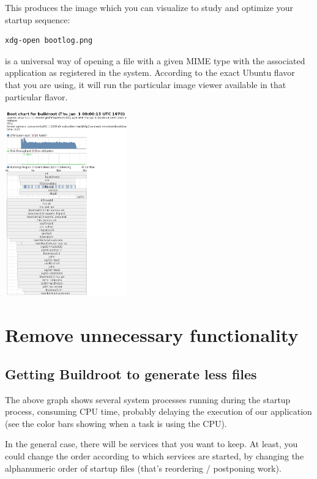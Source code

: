 This produces the  image which you can visualize to
study and optimize your startup sequence:

\begin{verbatim}
xdg-open bootlog.png
\end{verbatim}

 is a universal way of opening a file with a given MIME
type with the associated application as registered in the system.
According to the exact Ubuntu flavor that you are using,
it will run the particular image viewer available in that
particular flavor.

\begin{center}
\includegraphics[height=8cm]{labs/boot-time-init-scripts/bootlog.png}
\end{center}

\section{Remove unnecessary functionality}

\subsection{Getting Buildroot to generate less files}

The above graph shows several system processes running
during the startup process, consuming CPU time, probably delaying
the execution of our application (see the color bars showing when
a task is using the CPU).

In the general case, there will be services that you want to keep. At
least, you could change the order according to which services are
started, by changing the alphanumeric order of startup files (that's
reordering / postponing work).

